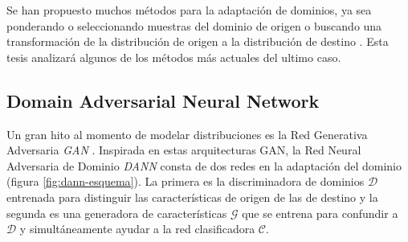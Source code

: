 Se han propuesto muchos métodos para la adaptación de dominios, ya sea ponderando o seleccionando muestras del dominio
de origen \parencite{sugiyama2007direct} o buscando una transformación de la distribución de origen a la distribución de destino \parencite{gong2013connecting}. Esta tesis analizar\'a algunos de los m\'etodos m\'as actuales del ultimo caso.

\subsection{Domain Adversarial Neural Network}
Un gran hito al momento de modelar distribuciones es la Red Generativa Adversaria {\it GAN} \parencite{goodfellow2020generative}. Inspirada en estas arquitecturas GAN, la Red Neural Adversaria de Dominio {\it DANN} \parencite{ganin2016domain} consta de dos redes en la adaptación del dominio (figura \ref{fig:dann-esquema}). La primera es
la discriminadora de dominios $\mathcal{D}$ entrenada para distinguir las características de origen de las de destino y
la segunda es una generadora de características $\mathcal{G}$ que se entrena para confundir a $\mathcal{D}$ y
simult\'aneamente ayudar a la red clasificadora $\mathcal{C}$.

